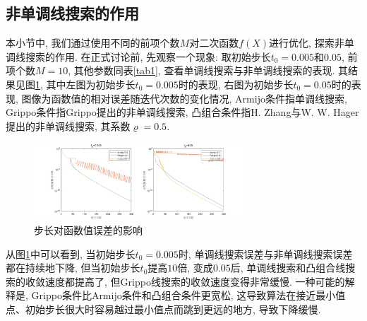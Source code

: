 \documentclass[UTF8]{ctexart}
\begin{document}
\subsection{非单调线搜索的作用}

本小节中, 我们通过使用不同的前项个数$M$对二次函数$f(X)$进行优化, 探索非单调线搜索的作用. 在正式讨论前, 先观察一个现象: 取初始步长$t_0=0.005$和$0.05$, 前项个数$M=10$, 其他参数同表\ref{tab1}, 查看单调线搜索与非单调线搜索的表现. 其结果见图\ref{fig3}, 其中左图为初始步长$t_0=0.005$时的表现, 右图为初始步长$t_0=0.05$时的表现, 图像为函数值的相对误差随迭代次数的变化情况, Armijo条件指单调线搜索, Grippo条件指Grippo提出的非单调线搜索, 凸组合条件指H. Zhang与W. W. Hager提出的非单调线搜索, 其系数$\varrho=0.5$. 

\begin{figure}[htb]
    \centering
    \includegraphics[width=0.7\textwidth]{Q2-figure/3.png}
    \caption{步长对函数值误差的影响}\label{fig3}
\end{figure}

从图\ref{fig3}中可以看到, 当初始步长$t_0=0.005$时, 单调线搜索误差与非单调线搜索误差都在持续地下降, 但当初始步长$t_0$提高$10$倍, 变成$0.05$后, 单调线搜索和凸组合线搜索的收敛速度都提高了, 但Grippo线搜索的收敛速度变得非常缓慢. 一种可能的解释是, Grippo条件比Armijo条件和凸组合条件更宽松, 这导致算法在接近最小值点、初始步长很大时容易越过最小值点而跳到更远的地方, 导致下降缓慢. 



\end{document}
